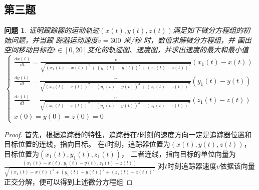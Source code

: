 \documentclass[a4paper, 12pt]{ctexart}
\newtheorem*{example}{问题}
\begin{document}
\subsection{第三题}

\begin{example}
    证明跟踪器的运动轨迹$(x(t),y(t),z(t))$满足如下微分方程组的初始问题，并当跟
    踪器运动速度$v=300$ 米/秒 时，数值求解微分方程组，并
    画出空间移动目标在$t\in [0,20]$变化的轨迹图、速度图，并求出速度的最大和最小值
    $$\begin{cases}
    \frac{dx(t)}{dt} = \frac{v}{\sqrt{(x_1(t)-x(t))^2+(y_1(t)-y(t))^2+(z_1(t)-z(t))^2}} (x_1(t)-x(t))  \\
    \frac{dy(t)}{dt} = \frac{v}{\sqrt{(x_1(t)-x(t))^2+(y_1(t)-y(t))^2+(z_1(t)-z(t))^2}} (y_1(t)-y(t))  \\
    \frac{dz(t)}{dt} = \frac{v}{\sqrt{(x_1(t)-x(t))^2+(y_1(t)-y(t))^2+(z_1(t)-z(t))^2}} (z_1(t)-z(t))  \\
    x(0)=y(0)=z(0)=0
    \end{cases}
    $$
\end{example}


\begin{proof}
    首先，根据追踪器的特性，追踪器在$t$时刻的速度方向一定是追踪器位置和目标位置的连线，指向目标。
    在$t$时刻，追踪器位置为$(x(t),y(t),z(t))$，目标位置为$(x_1(t),y_1(t),z_1(t))$，
    二者连线，指向目标的单位向量为$\frac{(x_1(t)-x(t),y_1(t)-y(t),z_1(t)-z(t))}{\sqrt{(x_1(t)-x(t))^2+(y_1(t)-y(t))^2+(z_1(t)-z(t))^2}}$
    对$t$时刻追踪器速度$v$依据该向量正交分解，便可以得到上述微分方程组
\end{proof}
\end{document}
